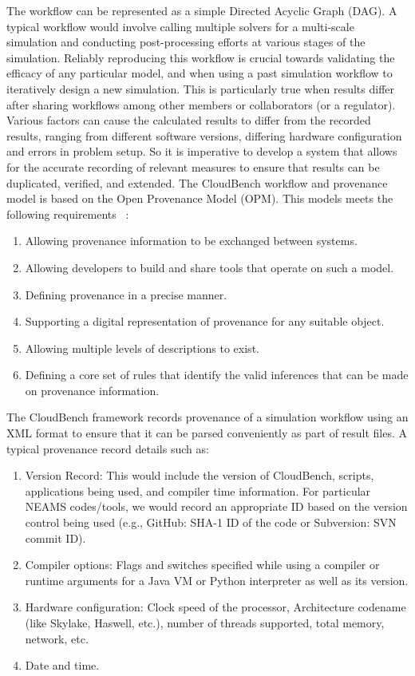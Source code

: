 The workflow can be represented as a simple Directed Acyclic Graph (DAG). A 
typical workflow would involve calling multiple solvers for a multi-scale 
simulation and conducting post-processing efforts at various stages of 
the simulation. Reliably reproducing this workflow is crucial towards 
validating the efficacy of any particular model, and when using a past simulation workflow to iteratively design a new simulation. This is particularly true when 
results differ after sharing workflows among other members or collaborators (or a regulator). 
Various factors can cause the calculated results to differ from the recorded 
results, ranging from different software versions, differing hardware 
configuration and errors in problem setup. So it is imperative to develop a 
system that allows for the accurate recording of relevant measures to ensure 
that results can be duplicated, verified, and extended. The CloudBench workflow and
provenance model is based on the Open Provenance Model (OPM). This models meets the following requirements ~\cite{open_provenance_spec}:

\begin{enumerate}
\item Allowing provenance information to be exchanged between systems.
\item Allowing developers to build and share tools that operate on such a model.
\item Defining provenance in a precise manner.
\item Supporting a digital representation of provenance for any suitable object.
\item Allowing multiple levels of descriptions to exist.
\item Defining a core set of rules that identify the valid inferences that can 
be made on provenance information.
\end{enumerate}

The CloudBench framework records provenance of a simulation workflow using an
XML format to ensure that it can be parsed conveniently as part of result 
files. A typical provenance record details such as:

\begin{enumerate}
\item Version Record: This would include the version of CloudBench, scripts, applications being used, and compiler time information. 
For particular NEAMS codes/tools, we would record an appropriate ID based on 
the version control being used (e.g., GitHub: SHA-1 ID of the code or Subversion: SVN commit ID).
  
\item Compiler options: Flags and switches specified while using a compiler or 
runtime arguments for a Java VM or Python interpreter as well as its version.

\item Hardware configuration: Clock speed of the processor, Architecture 
codename (like Skylake, Haswell, etc.), number of threads supported, total 
memory, network, etc.
\item Date and time.
\end{enumerate}


